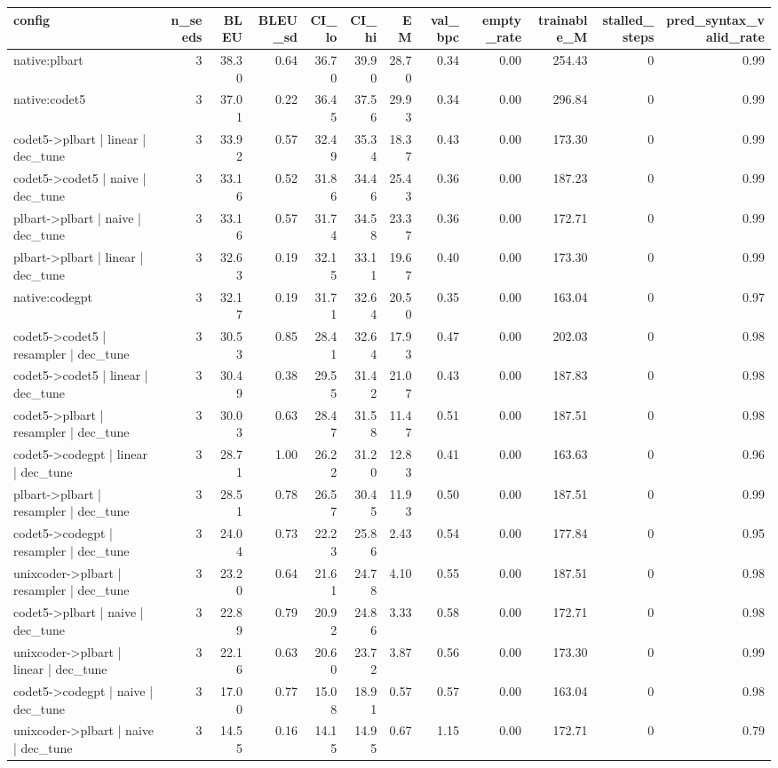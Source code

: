 \begin{tabular}{lrrrrrrrrrrr}
\toprule
config & n_seeds & BLEU & BLEU_sd & CI_lo & CI_hi & EM & val_bpc & empty_rate & trainable_M & stalled_steps & pred_syntax_valid_rate \\
\midrule
native:plbart & 3 & 38.30 & 0.64 & 36.70 & 39.90 & 28.70 & 0.34 & 0.00 & 254.43 & 0 & 0.99 \\
native:codet5 & 3 & 37.01 & 0.22 & 36.45 & 37.56 & 29.93 & 0.34 & 0.00 & 296.84 & 0 & 0.99 \\
codet5->plbart | linear | dec_tune & 3 & 33.92 & 0.57 & 32.49 & 35.34 & 18.37 & 0.43 & 0.00 & 173.30 & 0 & 0.99 \\
codet5->codet5 | naive | dec_tune & 3 & 33.16 & 0.52 & 31.86 & 34.46 & 25.43 & 0.36 & 0.00 & 187.23 & 0 & 0.99 \\
plbart->plbart | naive | dec_tune & 3 & 33.16 & 0.57 & 31.74 & 34.58 & 23.37 & 0.36 & 0.00 & 172.71 & 0 & 0.99 \\
plbart->plbart | linear | dec_tune & 3 & 32.63 & 0.19 & 32.15 & 33.11 & 19.67 & 0.40 & 0.00 & 173.30 & 0 & 0.99 \\
native:codegpt & 3 & 32.17 & 0.19 & 31.71 & 32.64 & 20.50 & 0.35 & 0.00 & 163.04 & 0 & 0.97 \\
codet5->codet5 | resampler | dec_tune & 3 & 30.53 & 0.85 & 28.41 & 32.64 & 17.93 & 0.47 & 0.00 & 202.03 & 0 & 0.98 \\
codet5->codet5 | linear | dec_tune & 3 & 30.49 & 0.38 & 29.55 & 31.42 & 21.07 & 0.43 & 0.00 & 187.83 & 0 & 0.98 \\
codet5->plbart | resampler | dec_tune & 3 & 30.03 & 0.63 & 28.47 & 31.58 & 11.47 & 0.51 & 0.00 & 187.51 & 0 & 0.98 \\
codet5->codegpt | linear | dec_tune & 3 & 28.71 & 1.00 & 26.22 & 31.20 & 12.83 & 0.41 & 0.00 & 163.63 & 0 & 0.96 \\
plbart->plbart | resampler | dec_tune & 3 & 28.51 & 0.78 & 26.57 & 30.45 & 11.93 & 0.50 & 0.00 & 187.51 & 0 & 0.99 \\
codet5->codegpt | resampler | dec_tune & 3 & 24.04 & 0.73 & 22.23 & 25.86 & 2.43 & 0.54 & 0.00 & 177.84 & 0 & 0.95 \\
unixcoder->plbart | resampler | dec_tune & 3 & 23.20 & 0.64 & 21.61 & 24.78 & 4.10 & 0.55 & 0.00 & 187.51 & 0 & 0.98 \\
codet5->plbart | naive | dec_tune & 3 & 22.89 & 0.79 & 20.92 & 24.86 & 3.33 & 0.58 & 0.00 & 172.71 & 0 & 0.98 \\
unixcoder->plbart | linear | dec_tune & 3 & 22.16 & 0.63 & 20.60 & 23.72 & 3.87 & 0.56 & 0.00 & 173.30 & 0 & 0.99 \\
codet5->codegpt | naive | dec_tune & 3 & 17.00 & 0.77 & 15.08 & 18.91 & 0.57 & 0.57 & 0.00 & 163.04 & 0 & 0.98 \\
unixcoder->plbart | naive | dec_tune & 3 & 14.55 & 0.16 & 14.15 & 14.95 & 0.67 & 1.15 & 0.00 & 172.71 & 0 & 0.79 \\
\bottomrule
\end{tabular}
